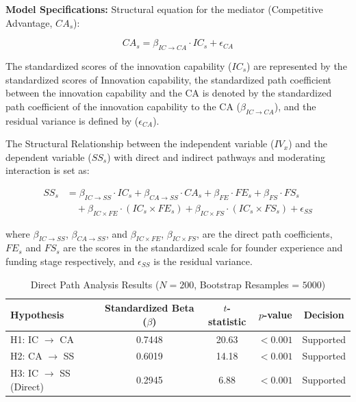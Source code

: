 \documentclass{ieeeaccess}
\begin{document}
\textbf{Model Specifications:}
Structural equation for the mediator (Competitive Advantage, $CA_s$):

\begin{equation}
CA_s
=
\beta_{IC \to CA}\cdot IC_s
+
\epsilon_{CA}
\end{equation}

The standardized scores of the innovation capability ($IC_s$) are represented by the standardized scores of Innovation capability, the standardized path coefficient between the innovation capability and the CA is denoted by the standardized path coefficient of the innovation capability to the CA ($\beta_{IC \to CA}$), and the residual variance is defined by ($\epsilon_{CA}$).

The Structural Relationship between the independent variable ($IV_x$) and the dependent variable ($SS_s$) with direct and indirect pathways and moderating interaction is set as:

\begin{figure}[!t]
\normalsize
\begin{equation}
\begin{aligned}
SS_s
&=
\beta_{IC \to SS}\cdot IC_s
+
\beta_{CA \to SS}\cdot CA_s
+
\beta_{FE}\cdot FE_s
+
\beta_{FS}\cdot FS_s \\
&\quad +
\beta_{IC \times FE}\cdot (IC_s \times FE_s)
+
\beta_{IC \times FS}\cdot (IC_s \times FS_s)
+
\epsilon_{SS}
\end{aligned}
\end{equation}
\hrulefill
\end{figure}

where $\beta_{IC \to SS}$, $\beta_{CA \to SS}$, and $\beta_{IC \times FE}$, $\beta_{IC \times FS}$, are the direct path coefficients, $FE_s$ and $FS_s$ are the scores in the standardized scale for founder experience and funding stage respectively, and $\epsilon_{SS}$ is the residual variance.

\begin{table}[htbp]
\caption{Direct Path Analysis Results ($N = 200$, Bootstrap Resamples = $5000$)}
\label{tab:path_analysis}
\centering
\begin{tabular}{lcccc}
\hline
\textbf{Hypothesis} &
\textbf{Standardized Beta ($\beta$)} &
\textbf{$t$-statistic} &
\textbf{$p$-value} &
\textbf{Decision} \\
\hline

H1: IC $\rightarrow$ CA
& 0.7448
& 20.63
& $< 0.001$
& Supported \\

H2: CA $\rightarrow$ SS
& 0.6019
& 14.18
& $< 0.001$
& Supported \\

H3: IC $\rightarrow$ SS (Direct)
& 0.2945
& 6.88
& $< 0.001$
& Supported \\
\hline
\end{tabular}
\end{table}
\end{document}
